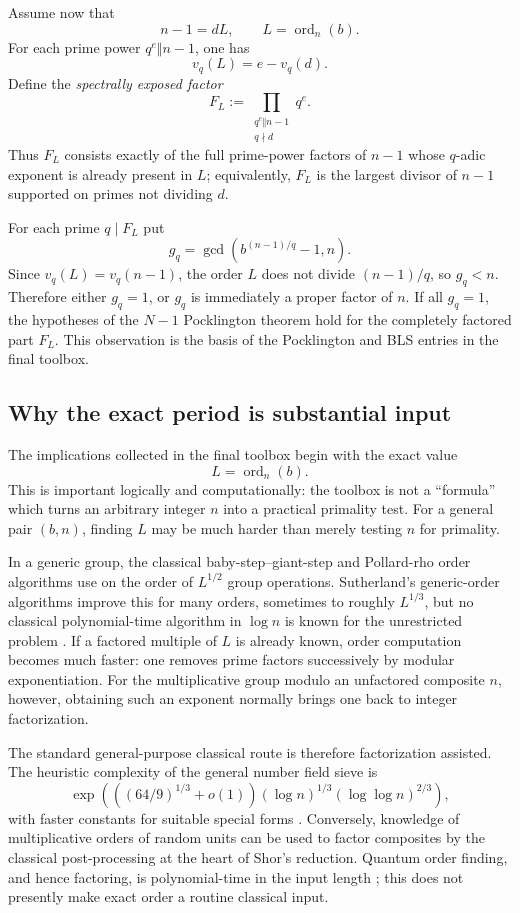 \documentclass[11pt]{article}
\newcommand{\ord}{\operatorname{ord}}
\begin{document}
Assume now that
\[
n-1=dL,
\qquad L=\ord_n(b).
\]
For each prime power $q^e\Vert n-1$, one has
\[
v_q(L)=e-v_q(d).
\]
Define the \emph{spectrally exposed factor}
\begin{equation}
F_L:=\prod_{\substack{q^e\Vert n-1\\q\nmid d}}q^e.
\label{eq:FL}
\end{equation}
Thus $F_L$ consists exactly of the full prime-power factors of $n-1$ whose
$q$-adic exponent is already present in $L$; equivalently, $F_L$ is the
largest divisor of $n-1$ supported on primes not dividing $d$.

For each prime $q\mid F_L$ put
\begin{equation}
g_q=\gcd\!\left(b^{(n-1)/q}-1,n\right).
\label{eq:gq}
\end{equation}
Since $v_q(L)=v_q(n-1)$, the order $L$ does not divide $(n-1)/q$, so
$g_q<n$.  Therefore either $g_q=1$, or $g_q$ is immediately a proper factor
of $n$.  If all $g_q=1$, the hypotheses of the $N-1$ Pocklington theorem
hold for the completely factored part $F_L$.  This observation is the basis
of the Pocklington and BLS entries in the final toolbox.


\subsection{Why the exact period is substantial input}
\label{subsec:order-complexity}

The implications collected in the final toolbox begin with the exact value
\[
L=\ord_n(b).
\]
This is important logically and computationally: the toolbox is not a
``formula'' which turns an arbitrary integer $n$ into a practical primality
test.  For a general pair $(b,n)$, finding $L$ may be much harder than merely
testing $n$ for primality.

In a generic group, the classical baby-step--giant-step and Pollard-rho order
algorithms use on the order of $L^{1/2}$ group operations.  Sutherland's
generic-order algorithms improve this for many orders, sometimes to roughly
$L^{1/3}$, but no classical polynomial-time algorithm in $\log n$ is known for
the unrestricted problem \cite{Sutherland2007}.  If a factored multiple of
$L$ is already known, order computation becomes much faster: one removes prime
factors successively by modular exponentiation.  For the multiplicative group
modulo an unfactored composite $n$, however, obtaining such an exponent
normally brings one back to integer factorization.

The standard general-purpose classical route is therefore factorization
assisted.  The heuristic complexity of the general number field sieve is
\[
\exp\!\left(
 \left((64/9)^{1/3}+o(1)\right)
 (\log n)^{1/3}(\log\log n)^{2/3}
\right),
\]
with faster constants for suitable special forms \cite{Pomerance1996}.
Conversely, knowledge of multiplicative orders of random units can be used to
factor composites by the classical post-processing at the heart of Shor's
reduction.  Quantum order finding, and hence factoring, is polynomial-time in
the input length \cite{Shor1997}; this does not presently make exact order a
routine classical input.
\end{document}
